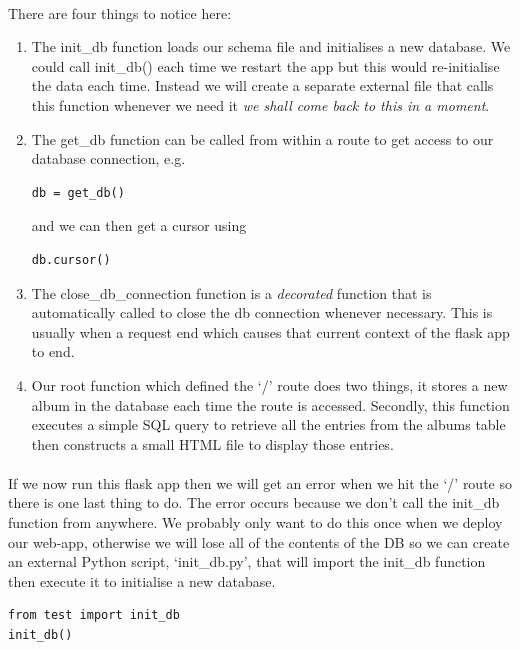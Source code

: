 \documentclass[12pt, a4paper, twoside]{book}
\begin{document}
\paragraph{} There are four things to notice here:

\begin{enumerate}
\item The init\_db function loads our schema file and initialises a new database. We could call init\_db() each time we restart the app but this would re-initialise the data each time. Instead we will create a separate external file that calls this function whenever we need it \emph{we shall come back to this in a moment}.
\item The get\_db function can be called from within a route to get access to our database connection, e.g.
\begin{lstlisting}[style=DOS]
db = get_db()
\end{lstlisting}
and we can then get a cursor using
\begin{lstlisting}[style=DOS]
db.cursor()
\end{lstlisting}
\item The close\_db\_connection function is a \emph{decorated} function that is automatically called to close the db connection whenever necessary. This is usually when a request end which causes that current context of the flask app to end.
\item Our root function which defined the `/' route does two things, it stores a new album in the database each time the route is accessed. Secondly, this function executes a simple SQL query to retrieve all the entries from the albums table then constructs a small HTML file to display those entries. 
\end{enumerate}

\paragraph{} If we now run this flask app then we will get an error when we hit the `/' route so there is one last thing to do. The error occurs because we don't call the init\_db function from anywhere. We probably only want to do this once when we deploy our web-app, otherwise we will lose all of the contents of the DB so we can create an external Python script, `init\_db.py', that will import the init\_db function then execute it to initialise a new database.

\begin{lstlisting}
from test import init_db
init_db()
\end{lstlisting}
\end{document}
